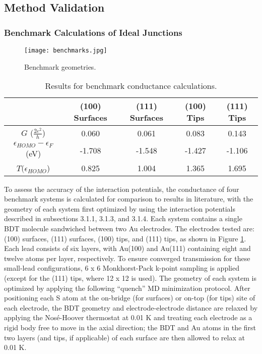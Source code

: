 \documentclass[10pt]{report}  %
\newcommand\findent{\hspace*{\parindent}}
\newcommand{\T}{\rule{0pt}{2.6ex}}
\newcommand{\B}{\rule[-1.2ex]{0pt}{0pt}}
\begin{document}
\subsection{Method Validation}

\subsubsection{Benchmark Calculations of Ideal Junctions}

\begin{figure}[b]
	\centering
	\texttt{[image: benchmarks.jpg]}
        \caption{Benchmark geometries.}
	\label{fig:benchmarks}
\end{figure}  

%
%
\begin{table} [b!] 
\caption{Results for benchmark conductance calculations. }
\centering
\begin{tabular}{ | c | c | c | c | c |}
	\hline
\T \B & (100) Surfaces & (111) Surfaces & (100) Tips & (111) Tips \\
	\hline
$G$ ($\frac{2e^{2}}{h}$) \T \B & 0.060 & 0.061 & 0.083 & 0.143  \\
	\hline
$\epsilon_{HOMO} - \epsilon_{F}$ (eV) \T \B & -1.708 & -1.548 & -1.427 & -1.106  \\
	\hline
$T(\epsilon_{HOMO}$) \T \B & 0.825 & 1.004 & 1.365 & 1.695  \\
	\hline
\end{tabular}
\label{table:benchmarks}
\end{table}

\findent To assess the accuracy of the interaction potentials, the conductance of four benchmark systems is calculated for comparison to results in literature, with the geometry of each system first optimized by using the interaction potentials described in subsections 3.1.1, 3.1.3, and 3.1.4.  Each system contains a single BDT molecule sandwiched between two Au electrodes.  The electrodes tested are: (100) surfaces, (111) surfaces, (100) tips, and (111) tips, as shown in Figure \ref{fig:benchmarks}. Each lead consists of six layers, with Au(100) and Au(111) containing eight and twelve atoms per layer, respectively. To ensure converged transmission for these small-lead configurations, 6 x 6 Monkhorst-Pack k-point sampling is applied (except for the (111) tips, where 12 x 12 is used). The geometry of each system is optimized by applying the following ``quench'' MD minimization protocol. After positioning each S atom at the on-bridge (for surfaces) or on-top (for tips) site of each electrode, the BDT geometry and electrode-electrode distance are relaxed by applying the Nos\'{e}-Hoover thermostat at 0.01 K and treating each electrode as a rigid body free to move in the axial direction; the BDT and Au atoms in the first two layers (and tips, if applicable) of each surface are then allowed to relax at 0.01 K.  
\end{document}

